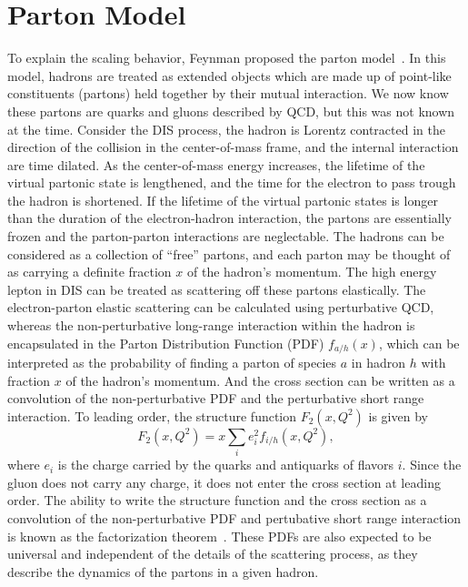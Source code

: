 \documentclass[../main.tex]{subfiles}
\begin{document}
\section{Parton Model}
\label{sec:parton}
To explain the scaling behavior, Feynman proposed the parton model~\cite{feynman1969}.
In this model, hadrons are treated as extended objects which are made up of point-like
constituents (partons) held together by their mutual interaction. We now know
these partons are quarks and gluons described by QCD, but this was not known at
the time. Consider the DIS process, the hadron is Lorentz contracted in the
direction of the collision in the center-of-mass frame, and the internal
interaction are time dilated. As the center-of-mass energy increases, the
lifetime of the virtual partonic state is lengthened, and the time for the
electron to pass trough the hadron is shortened. If the lifetime of the virtual
partonic states is longer than the duration of the electron-hadron interaction,
the partons are essentially frozen and the parton-parton interactions are
neglectable. The hadrons can be considered as a collection of ``free'' partons,
and each parton may be thought of as carrying a definite fraction $x$ of the
hadron's momentum. The high energy lepton in DIS can be treated as scattering
off these partons elastically. The electron-parton elastic scattering can be
calculated using perturbative QCD, whereas the non-perturbative long-range
interaction within the hadron is encapsulated in the Parton Distribution
Function (PDF) $f_{a/h}\left(x\right)$, which can be interpreted as the probability
of finding a parton of species $a$ in hadron $h$ with fraction $x$ of the hadron's momentum.
And the cross section can be written as a convolution
of the non-perturbative PDF and the perturbative short range interaction. To leading
order, the structure function $F_2\left(x,Q^2\right)$ is given by
\begin{equation}
	F_2\left(x,Q^2\right)=x\sum_i e^2_i f_{i/h}\left(x,Q^2\right),
	\label{eq:F2_parton}
\end{equation}
where $e_i$ is the charge carried by the quarks and antiquarks of flavors $i$. Since the
gluon does not carry any charge, it does not enter the cross section at leading
order. The ability to write the structure function and the cross section as a
convolution of the non-perturbative PDF and pertubative short range interaction
is known as the factorization theorem~\cite{collins1989}. These PDFs are also
expected to be universal and independent of the details of the scattering
process, as they describe the dynamics of the partons in a given hadron.
\end{document}
